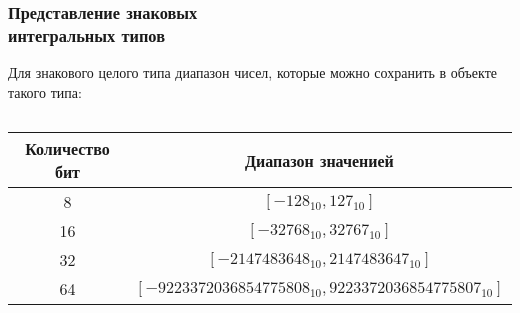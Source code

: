 \documentclass[compress, 8pt]{beamer}
\begin{document}
\begin{frame}[fragile]

    \frametitle{Представление знаковых \\ интегральных типов}

    Для знакового целого типа диапазон чисел, которые можно
    сохранить в объекте такого типа:

    \begin{displaymath}
        [-2^{N-1}, 2^{N-1}-1]
    \end{displaymath}

    \hfill \break

    \begin{center}
        \begin{tabular}{|c|c|}
            \hline
            Количество бит & Диапазон значенией \\
            \hline
            \hline
            8 & \([-128_{10},127_{10}]\) \\
            16 & \([-32768_{10},32767_{10}]\) \\
            32 & \([-2147483648_{10},2147483647_{10}]\) \\
            64 & \([-9223372036854775808_{10},9223372036854775807_{10}]\) \\
            \hline
        \end{tabular}
    \end{center}

\end{frame}
\end{document}
